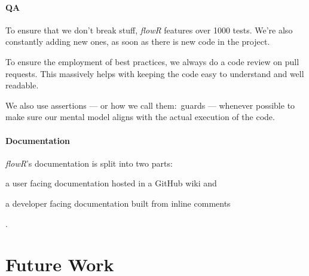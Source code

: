 \documentclass[color,coloraccent=red!60!black]{poster}
\begin{document}
\begin{multicols}{3}
	\paragraph{QA} To ensure that we don't break stuff, \textit{flowR} features over
	1000 tests. We're also constantly adding new ones, as soon as there is new code in
	the project.\par
	To ensure the employment of best practices, we always do a code review on pull
	requests. This massively helps with keeping the code easy to understand and well
	readable.\par
	We also use assertions --- or how we call them:~guards --- whenever possible to make
	sure our mental model aligns with the actual execution of the code.
	\paragraph{Documentation} \textit{flowR}'s documentation is split into two parts:
	\begin{enumerate*}
		\item a user facing documentation hosted in a GitHub wiki and
		\item a developer facing documentation built from inline comments
	\end{enumerate*}. %
	\section*{Future Work}
	\lipsum[2]
\end{multicols}
\end{document}
